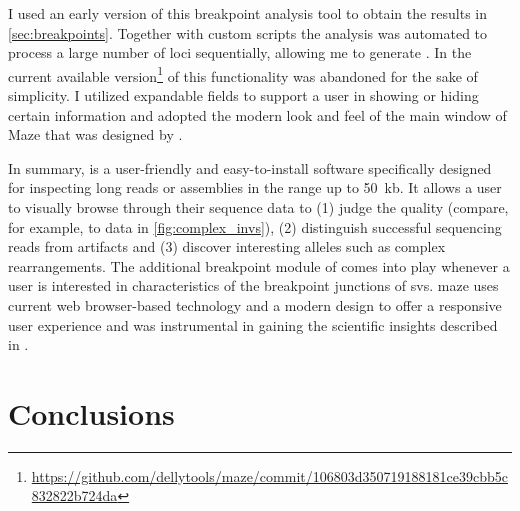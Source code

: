 I used an early version of this breakpoint analysis tool to obtain the results
in \cref{sec:breakpoints}. Together with custom scripts the analysis was
automated to process a large number of loci sequentially, allowing me to
generate .
In the current available version\footnote{\url{https://github.com/dellytools/maze/commit/106803d350719188181ce39cbb5c832822b724da}}
of \maze this functionality was abandoned for the sake of simplicity. I utilized
expandable fields to support a user in showing or hiding certain information and
adopted the modern look and feel of the main window of Maze that was designed by
\markus.

In summary, \maze is a user-friendly and easy-to-install software specifically
designed for inspecting long reads or assemblies in the range up to 50~kb. It
allows a user to visually browse through their sequence data to (1) judge the
quality (compare, for example, \pacbio to \minion data in \cref{fig:complex_invs}),
(2) distinguish successful sequencing reads from artifacts and (3) discover
interesting alleles such as complex rearrangements. The additional breakpoint
module of \maze comes into play whenever a user is interested in characteristics
of the breakpoint junctions of \acp{sv}. \Ac{maze} uses current web browser-based
technology and a modern design to offer a responsive user experience and was
instrumental in gaining the scientific insights described in
.








\section{Conclusions}









